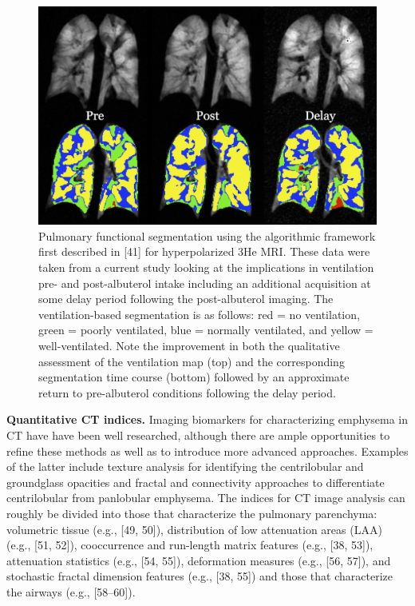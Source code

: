 \documentclass[11pt,]{article}
\begin{document}
\begin{figure}[htbp]
\centering
\includegraphics{Figs/prePostAlbuterol.png}
\caption{Pulmonary functional segmentation using the algorithmic
framework first described in {[}41{]} for hyperpolarized 3He MRI. These
data were taken from a current study looking at the implications in
ventilation pre- and post-albuterol intake including an additional
acquisition at some delay period following the post-albuterol imaging.
The ventilation-based segmentation is as follows: red = no ventilation,
green = poorly ventilated, blue = normally ventilated, and yellow =
well-ventilated. Note the improvement in both the qualitative assessment
of the ventilation map (top) and the corresponding segmentation time
course (bottom) followed by an approximate return to pre-albuterol
conditions following the delay period.}
\end{figure}

\textbf{Quantitative CT indices.} Imaging biomarkers for characterizing
emphysema in CT have have been well researched, although there are ample
opportunities to refine these methods as well as to introduce more
advanced approaches. Examples of the latter include texture analysis for
identifying the centrilobular and groundglass opacities and fractal and
connectivity approaches to differentiate centrilobular from panlobular
emphysema. The indices for CT image analysis can roughly be divided into
those that characterize the pulmonary parenchyma: volumetric tissue
(e.g., {[}49, 50{]}), distribution of low attenuation areas (LAA) (e.g.,
{[}51, 52{]}), cooccurrence and run-length matrix features (e.g., {[}38,
53{]}), attenuation statistics (e.g., {[}54, 55{]}), deformation
measures (e.g., {[}56, 57{]}), and stochastic fractal dimension features
(e.g., {[}38, 55{]}) and those that characterize the airways (e.g.,
{[}58--60{]}).
\end{document}
